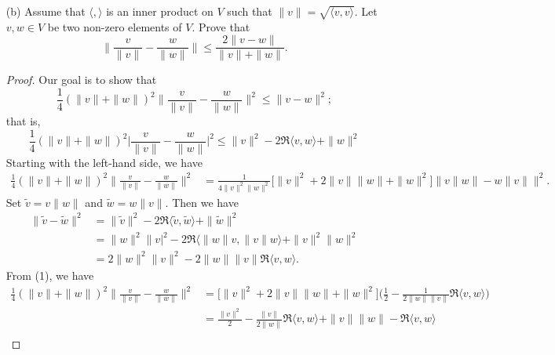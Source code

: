 \documentclass[a4paper]{article}
\begin{document}
\begin{enumerate}
\begin{proof}
        \end{proof}
    \item[(b)] Assume that \( \langle  ,  \rangle  \) is an inner product on \( V  \) such that \( \|v \| = \sqrt{ \langle v  ,  v  \rangle }  \). Let \( v,w \in V  \) be two non-zero elements of \( V  \). Prove that 
        \[  \Big\|\frac{ v }{ \|v\| }  - \frac{ w }{ \|w\| } \Big\| \leq \frac{ 2 \| v - w \| }{ \|v\| + \|w\| }. \]
        \begin{proof}
        Our goal is to show that 
        \[  \frac{ 1 }{ 4 }  (\|v\| + \|w\|)^{2} \Big\|\frac{ v }{ \|v\| }  - \frac{ w }{ \|w\| } \Big\|^{2} \leq \|v - w\|^{2}; \tag{*} \]
        that is, 
        \[  \frac{ 1 }{ 4 }  (\|v\| + \|w\|)^{2} \Big| \frac{ v }{ \|v\| }  - \frac{ w }{ \|w\| }  \Big| ^{2} \leq \|v\|^{2} - 2 \Re \langle v , w \rangle + \|w\|^{2} \]
        Starting with the left-hand side, we have 
        \begin{align*}
            \frac{ 1 }{ 4 } (\|v\| + \|w\|)^{2} \Big\|\frac{ v }{ \|v\| }  - \frac{ w  }{  \|w \| }    \Big\|^{2} &= \frac{ 1 }{ 4 \|v\|^{2} \|w\|^{2} }  \Big[ \|v\|^{2} + 2 \|v \| \|w \| + \|w\|^{2} \Big] \Big\| v \|w \| - w \| v \| \Big\|^{2}. \tag{1}
        \end{align*}
        Set \( \tilde{v} = v \|w \| \) and \( \tilde{w} = w \|v \| \). Then we have 
        \begin{align*}
            \|\tilde{v} - \tilde{w}\|^{2} &= \|\tilde{v}\|^{2} - 2 \Re \langle \tilde{v} ,  \tilde{w} \rangle + \| \tilde{w}\|^{2} \\
                                          &= \|w\|^{2} \|v|^{2} - 2 \Re \langle \|w\| v  ,  \|v\| w  \rangle + \|v\|^{2} \|w\|^{2} \\ 
                                          &= 2 \|w\|^{2} \|v\|^{2} - 2 \|w\| \|v\| \Re \langle v   , w  \rangle.
        \end{align*}
        From (1), we have 
        \begin{align*}
            \frac{ 1 }{ 4 } (\|v\| + \|w\|)^{2} \Big\| \frac{ v  }{ \|v\| }  - \frac{ w }{  \|w\| } \Big\|^{2} &= \Big[\|v\|^{2} + 2 \|v \| \|w \| + \|w\|^{2}\Big] \Big(  \frac{ 1 }{ 2 }  - \frac{ 1 }{ 2 \|w \| \|v \| }  \Re \langle v , w \rangle \Big) \\ 
                                                                                                               &= \frac{ \|v\|^{2} }{ 2  }  - \frac{ \|v\| }{ 2 \|w \| }  \Re \langle v , w \rangle + \|v\| \|w \| - \Re \langle v , w \rangle  \\

\end{align*}
\end{proof}
\end{enumerate}
\end{document}
